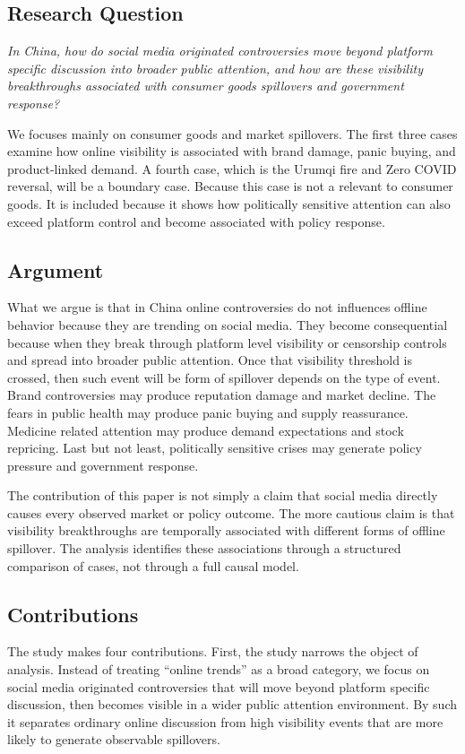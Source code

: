 \documentclass[conference]{IEEEtran}
\begin{document}
\subsection{Research Question}
\emph{In China, how do social media originated controversies move beyond platform specific discussion into broader public attention, and how are these visibility breakthroughs associated with consumer goods spillovers and government response?}

We focuses mainly on consumer goods and market spillovers. The first three cases examine how online visibility is associated with brand damage, panic buying, and product-linked demand. A fourth case, which is the Urumqi fire and Zero COVID reversal, will be a boundary case. Because this case is not a relevant to consumer goods. It is included because it shows how politically sensitive attention can also exceed platform control and become associated with policy response.

\subsection{Argument}
What we argue is that in China online controversies do not influences offline behavior because they are trending on social media. They become consequential because when they break through platform level visibility or censorship controls and spread into broader public attention. Once that visibility threshold is crossed, then such event will be form of spillover depends on the type of event. Brand controversies may produce reputation damage and market decline. The fears in public health may produce panic buying and supply reassurance. Medicine related attention may produce demand expectations and stock repricing. Last but not least, politically sensitive crises may generate policy pressure and government response.

The contribution of this paper is not simply a claim that social media directly causes every observed market or policy outcome. The more cautious claim is that visibility breakthroughs are temporally associated with different forms of offline spillover. The analysis identifies these associations through a structured comparison of cases, not through a full causal model.

\subsection{Contributions}

The study makes four contributions. First, the study narrows the object of analysis. Instead of treating ``online trends'' as a broad category, we focus on social media originated controversies that will move beyond platform specific discussion, then becomes visible in a wider public attention environment. By such it separates ordinary online discussion from high visibility events that are more likely to generate observable spillovers.
\end{document}
